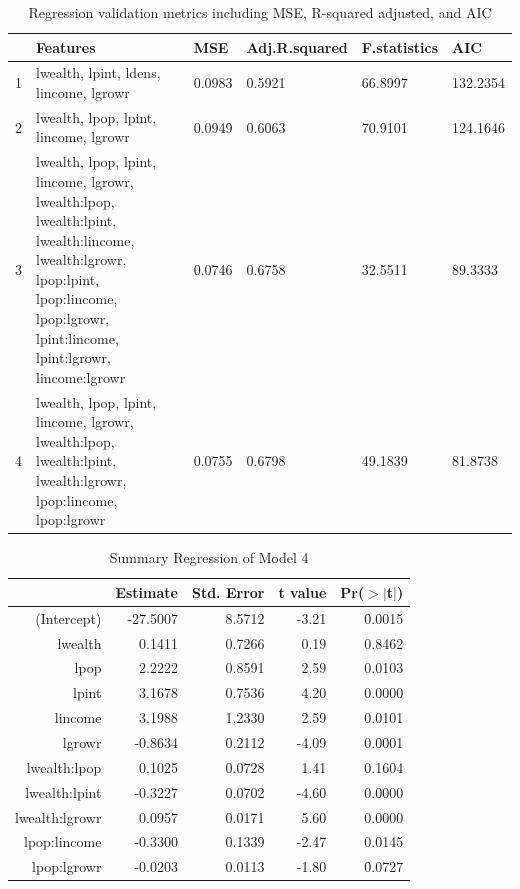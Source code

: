 \documentclass[11pt]{article}\usepackage[]{graphicx}\usepackage[]{color}
\begin{document}
\begin{center}
\begin{table}[ht]
\centering
\begin{tabular}{rp{2in}llll}
  \hline
 & Features & MSE & Adj.R.squared & F.statistics & AIC \\ 
  \hline
1 & lwealth, lpint, ldens, lincome, lgrowr & 0.0983 & 0.5921 & 66.8997 & 132.2354 \\ 
  2 & lwealth, lpop, lpint, lincome, lgrowr & 0.0949 & 0.6063 & 70.9101 & 124.1646 \\ 
  3 & lwealth, lpop, lpint, lincome, lgrowr, lwealth:lpop, lwealth:lpint, lwealth:lincome, lwealth:lgrowr, lpop:lpint, lpop:lincome, lpop:lgrowr, lpint:lincome, lpint:lgrowr, lincome:lgrowr & 0.0746 & 0.6758 & 32.5511 & 89.3333 \\ 
  4 & lwealth, lpop, lpint, lincome, lgrowr, lwealth:lpop, lwealth:lpint, lwealth:lgrowr, lpop:lincome, lpop:lgrowr & 0.0755 & 0.6798 & 49.1839 & 81.8738 \\ 
   \hline
\end{tabular}
\caption{Regression validation metrics including MSE, R-squared adjusted, and AIC} 
\label{reg_vali_metric}
\end{table}

\end{center}

\begin{center}
\begin{table}[ht]
\centering
\begin{tabular}{rrrrr}
  \hline
 & Estimate & Std. Error & t value & Pr($>$$|$t$|$) \\ 
  \hline
(Intercept) & -27.5007 & 8.5712 & -3.21 & 0.0015 \\ 
  lwealth & 0.1411 & 0.7266 & 0.19 & 0.8462 \\ 
  lpop & 2.2222 & 0.8591 & 2.59 & 0.0103 \\ 
  lpint & 3.1678 & 0.7536 & 4.20 & 0.0000 \\ 
  lincome & 3.1988 & 1.2330 & 2.59 & 0.0101 \\ 
  lgrowr & -0.8634 & 0.2112 & -4.09 & 0.0001 \\ 
  lwealth:lpop & 0.1025 & 0.0728 & 1.41 & 0.1604 \\ 
  lwealth:lpint & -0.3227 & 0.0702 & -4.60 & 0.0000 \\ 
  lwealth:lgrowr & 0.0957 & 0.0171 & 5.60 & 0.0000 \\ 
  lpop:lincome & -0.3300 & 0.1339 & -2.47 & 0.0145 \\ 
  lpop:lgrowr & -0.0203 & 0.0113 & -1.80 & 0.0727 \\ 
   \hline
\end{tabular}
\caption{Summary Regression of Model 4} 
\label{reg_summary_4}
\end{table}

\end{center}
\end{document}

